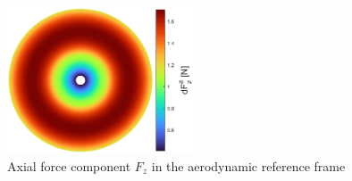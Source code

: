 {\begin{figure}[!htb]
    \centering
    \includegraphics[width=0.49\textwidth]{Figures/comp_method/sim_B/dFz_a.eps}
    \caption{Axial force component $F_z$ in the aerodynamic reference frame}
    \label{fig:axial_force_paper}
\end{figure}

}
